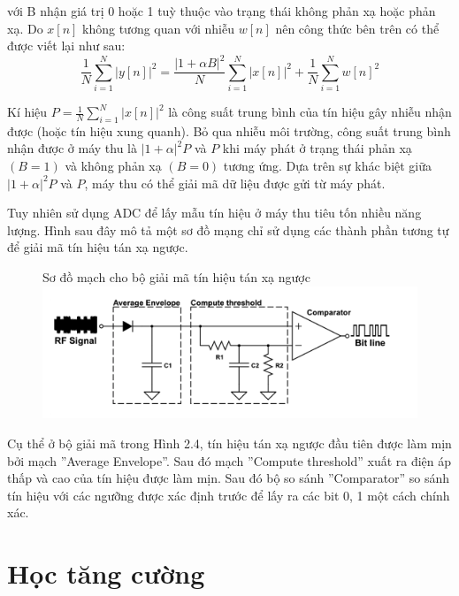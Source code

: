 \documentclass{uetgraduation}
\begin{document}
với B nhận giá trị 0 hoặc 1 tuỳ thuộc vào trạng thái không phản xạ hoặc phản xạ. Do $x[n]$ không tương quan với nhiễu $w[n]$ nên công thức bên trên có thể được viết lại như sau:
\begin{equation}
    \frac{1}{N} \sum_{i=1}^{N}|y[n]|^2 = \frac{|1 + \alpha B|^2}{N} \sum_{i=1}^{N}|x[n]|^2 + \frac{1}{N}\sum_{i=1}^{N}w[n]^2
\end{equation}

Kí hiệu $P = \frac{1}{N}\sum_{i=1}^{N}|x[n]|^2$ là công suất trung bình của tín hiệu gây nhiễu nhận được (hoặc tín hiệu xung quanh). Bỏ qua nhiễu môi trường, công suất trung bình
nhận được ở máy thu là $|1 + \alpha|^2 P$ và $P$ khi máy phát ở trạng thái phản xạ $(B = 1)$ và không phản xạ $(B = 0)$ tương ứng. Dựa trên sự khác biệt giữa $|1 + \alpha|^2 P$ 
và $P$, máy thu có thể giải mã dữ liệu được gửi từ máy phát.

Tuy nhiên sử dụng ADC để lấy mẫu tín hiệu ở máy thu tiêu tốn nhiều năng lượng. Hình sau đây mô tả một sơ đồ mạng chỉ sử dụng các thành phần tương tự để giải mã tín hiệu tán xạ ngược.
\begin{figure}{Sơ đồ mạch cho bộ giải mã tín hiệu tán xạ ngược}
    \centering
    \includegraphics[scale=0.7]{backscatter_circuit}
    \label{fig:backscatter}
\end{figure}

Cụ thể ở bộ giải mã trong Hình 2.4, tín hiệu tán xạ ngược đầu tiên được làm mịn bởi mạch ''Average Envelope''. Sau đó mạch ''Compute threshold'' xuất ra điện áp thấp và cao của tín
hiệu được làm mịn. Sau đó bộ so sánh ''Comparator'' so sánh tín hiệu với các ngưỡng được xác định trước để lấy ra các bit 0, 1 một cách chính xác.


\section{Học tăng cường}
\end{document}
